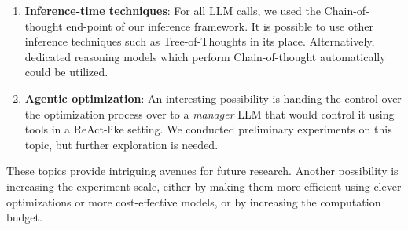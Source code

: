 \begin{enumerate}
    \item \textbf{Inference-time techniques}: For all LLM calls, we used the Chain-of-thought end-point of our inference framework. It is possible to use other inference techniques such as Tree-of-Thoughts in its place. Alternatively, dedicated reasoning models which perform Chain-of-thought automatically could be utilized.
    \item \textbf{Agentic optimization}: An interesting possibility is handing the control over the optimization process over to a \textit{manager} LLM that would control it using tools in a ReAct-like setting. We conducted preliminary experiments on this topic, but further exploration is needed. 
\end{enumerate}

These topics provide intriguing avenues for future research. Another possibility is increasing the experiment scale, either by making them more efficient
using clever optimizations or more cost-effective models, or by increasing the computation budget. 
